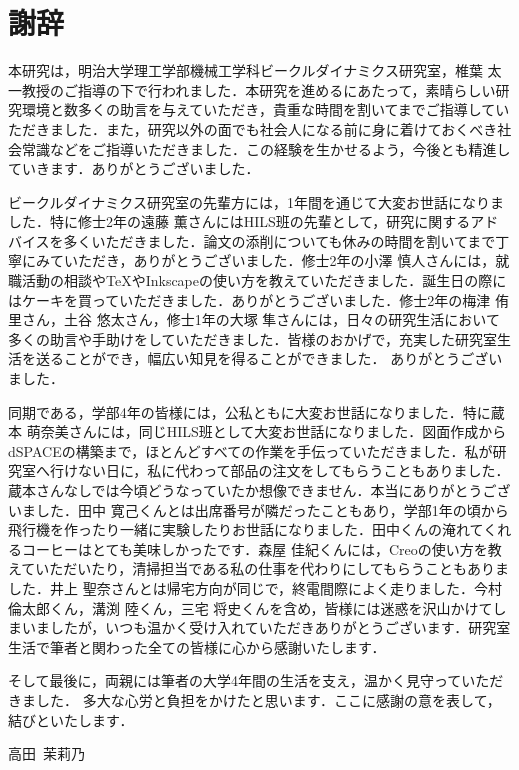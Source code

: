 \documentclass[a4paper,12pt]{article_vdlab_sotsuron}
\begin{document}
\newpage
\section*{謝辞}
本研究は，明治大学理工学部機械工学科ビークルダイナミクス研究室，椎葉 太一教授のご指導の下で行われました．本研究を進めるにあたって，素晴らしい研究環境と数多くの助言を与えていただき，貴重な時間を割いてまでご指導していただきました．また，研究以外の面でも社会人になる前に身に着けておくべき社会常識などをご指導いただきました．この経験を生かせるよう，今後とも精進していきます．ありがとうございました．\par
ビークルダイナミクス研究室の先輩方には，1年間を通じて大変お世話になりました．特に修士2年の遠藤 薫さんにはHILS班の先輩として，研究に関するアドバイスを多くいただきました．論文の添削についても休みの時間を割いてまで丁寧にみていただき，ありがとうございました．修士2年の小澤 慎人さんには，就職活動の相談やTeXやInkscapeの使い方を教えていただきました．誕生日の際にはケーキを買っていただきました．ありがとうございました．修士2年の梅津 侑里さん，土谷 悠太さん，修士1年の大塚 隼さんには，日々の研究生活において多くの助言や手助けをしていただきました．皆様のおかげで，充実した研究室生活を送ることができ，幅広い知見を得ることができました．
ありがとうございました．\par
同期である，学部4年の皆様には，公私ともに大変お世話になりました．特に蔵本 萌奈美さんには，同じHILS班として大変お世話になりました．図面作成からdSPACEの構築まで，ほとんどすべての作業を手伝っていただきました．私が研究室へ行けない日に，私に代わって部品の注文をしてもらうこともありました．蔵本さんなしでは今頃どうなっていたか想像できません．本当にありがとうございました．田中 寛己くんとは出席番号が隣だったこともあり，学部1年の頃から飛行機を作ったり一緒に実験したりお世話になりました．田中くんの淹れてくれるコーヒーはとても美味しかったです．森屋 佳紀くんには，Creoの使い方を教えていただいたり，清掃担当である私の仕事を代わりにしてもらうこともありました．井上 聖奈さんとは帰宅方向が同じで，終電間際によく走りました．今村 倫太郎くん，溝渕 陸くん，三宅 将史くんを含め，皆様には迷惑を沢山かけてしまいましたが，いつも温かく受け入れていただきありがとうございます．研究室生活で筆者と関わった全ての皆様に心から感謝いたします．\par
そして最後に，両親には筆者の大学4年間の生活を支え，温かく見守っていただきました．
多大な心労と負担をかけたと思います．ここに感謝の意を表して，結びといたします．

\begin{flushright}
  高田~茉莉乃
\end{flushright}
\end{document}
